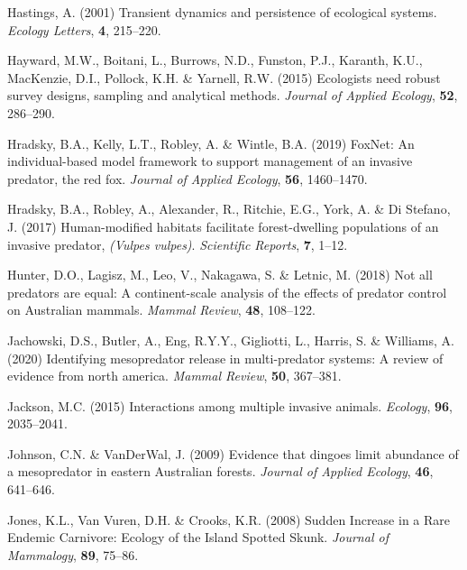 \documentclass[]{elsarticle} %
\begin{document}
\leavevmode\hypertarget{ref-hastings2001transient}{}%
Hastings, A. (2001) Transient dynamics and persistence of ecological systems. \emph{Ecology Letters}, \textbf{4}, 215--220.

\leavevmode\hypertarget{ref-hayward2015ecologists}{}%
Hayward, M.W., Boitani, L., Burrows, N.D., Funston, P.J., Karanth, K.U., MacKenzie, D.I., Pollock, K.H. \& Yarnell, R.W. (2015) Ecologists need robust survey designs, sampling and analytical methods. \emph{Journal of Applied Ecology}, \textbf{52}, 286--290.

\leavevmode\hypertarget{ref-hradsky2019foxnet}{}%
Hradsky, B.A., Kelly, L.T., Robley, A. \& Wintle, B.A. (2019) FoxNet: An individual-based model framework to support management of an invasive predator, the red fox. \emph{Journal of Applied Ecology}, \textbf{56}, 1460--1470.

\leavevmode\hypertarget{ref-hradsky2017human}{}%
Hradsky, B.A., Robley, A., Alexander, R., Ritchie, E.G., York, A. \& Di Stefano, J. (2017) Human-modified habitats facilitate forest-dwelling populations of an invasive predator, \emph{(Vulpes vulpes)}. \emph{Scientific Reports}, \textbf{7}, 1--12.

\leavevmode\hypertarget{ref-hunter2018not}{}%
Hunter, D.O., Lagisz, M., Leo, V., Nakagawa, S. \& Letnic, M. (2018) Not all predators are equal: A continent-scale analysis of the effects of predator control on Australian mammals. \emph{Mammal Review}, \textbf{48}, 108--122.

\leavevmode\hypertarget{ref-jachowski2020identifying}{}%
Jachowski, D.S., Butler, A., Eng, R.Y.Y., Gigliotti, L., Harris, S. \& Williams, A. (2020) Identifying mesopredator release in multi-predator systems: A review of evidence from north america. \emph{Mammal Review}, \textbf{50}, 367--381.

\leavevmode\hypertarget{ref-jackson2015interactions}{}%
Jackson, M.C. (2015) Interactions among multiple invasive animals. \emph{Ecology}, \textbf{96}, 2035--2041.

\leavevmode\hypertarget{ref-johnson2009evidence}{}%
Johnson, C.N. \& VanDerWal, J. (2009) Evidence that dingoes limit abundance of a mesopredator in eastern Australian forests. \emph{Journal of Applied Ecology}, \textbf{46}, 641--646.

\leavevmode\hypertarget{ref-jones2008sudden}{}%
Jones, K.L., Van Vuren, D.H. \& Crooks, K.R. (2008) Sudden Increase in a Rare Endemic Carnivore: Ecology of the Island Spotted Skunk. \emph{Journal of Mammalogy}, \textbf{89}, 75--86.
\end{document}

